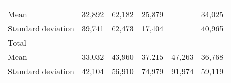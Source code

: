 \begin{tabular}{llllll}
  \multicolumn{1}{r}{} &
  \multicolumn{1}{r}{} &
  \multicolumn{1}{r}{} \\
\multicolumn{1}{l}{\hspace{4em}Mean} &
  \multicolumn{1}{|r}{32,892} &
  \multicolumn{1}{r}{62,182} &
  \multicolumn{1}{r}{25,879} &
  \multicolumn{1}{r}{} &
  \multicolumn{1}{r}{34,025} \\
\multicolumn{1}{l}{\hspace{4em}Standard deviation} &
  \multicolumn{1}{|r}{39,741} &
  \multicolumn{1}{r}{62,473} &
  \multicolumn{1}{r}{17,404} &
  \multicolumn{1}{r}{} &
  \multicolumn{1}{r}{40,965} \\
\multicolumn{1}{l}{\hspace{3em}Total} &
  \multicolumn{1}{|r}{} &
  \multicolumn{1}{r}{} &
  \multicolumn{1}{r}{} &
  \multicolumn{1}{r}{} &
  \multicolumn{1}{r}{} \\
\multicolumn{1}{l}{\hspace{4em}Mean} &
  \multicolumn{1}{|r}{33,032} &
  \multicolumn{1}{r}{43,960} &
  \multicolumn{1}{r}{37,215} &
  \multicolumn{1}{r}{47,263} &
  \multicolumn{1}{r}{36,768} \\
\multicolumn{1}{l}{\hspace{4em}Standard deviation} &
  \multicolumn{1}{|r}{42,104} &
  \multicolumn{1}{r}{56,910} &
  \multicolumn{1}{r}{74,979} &
  \multicolumn{1}{r}{91,974} &
  \multicolumn{1}{r}{59,119} \\
\cline{1-6}
\end{tabular}

